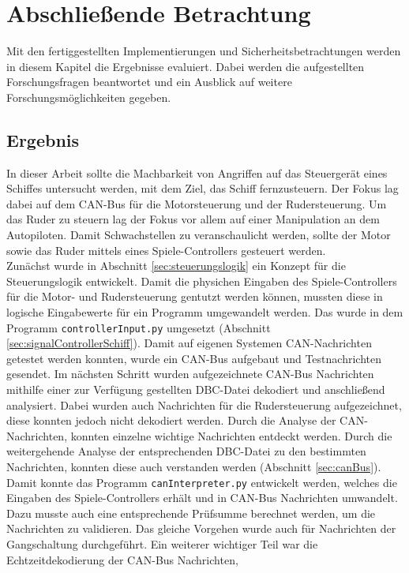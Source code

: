 \chapter{Abschließende Betrachtung}

Mit den fertiggestellten Implementierungen und Sicherheitsbetrachtungen werden in diesem Kapitel die 
Ergebnisse evaluiert. Dabei werden die aufgestellten Forschungsfragen beantwortet und ein Ausblick auf
weitere Forschungsmöglichkeiten gegeben.

\section{Ergebnis}
In dieser Arbeit sollte die Machbarkeit von Angriffen auf das Steuergerät eines Schiffes untersucht werden, mit dem Ziel, 
das Schiff fernzusteuern.
Der Fokus lag dabei auf dem CAN-Bus für die Motorsteuerung und der Rudersteuerung. Um das Ruder zu steuern lag der Fokus
vor allem auf einer Manipulation an dem Autopiloten.
Damit Schwachstellen zu veranschaulicht werden, sollte der Motor sowie das Ruder mittels eines Spiele-Controllers gesteuert werden. \\
Zunächst wurde in Abschnitt \ref{sec:steuerungslogik} ein Konzept für die Steuerungslogik entwickelt.
Damit die physichen Eingaben des Spiele-Controllers für die Motor- und Rudersteuerung gentutzt werden können, 
mussten diese in logische Eingabewerte für ein Programm umgewandelt werden.
Das wurde in dem Programm \texttt{controllerInput.py} umgesetzt (Abschnitt \ref{sec:signalControllerSchiff}). 
Damit auf eigenen Systemen CAN-Nachrichten getestet werden konnten, wurde ein CAN-Bus aufgebaut und Testnachrichten gesendet.
Im nächsten Schritt wurden aufgezeichnete CAN-Bus Nachrichten mithilfe einer zur Verfügung gestellten 
DBC-Datei dekodiert und anschließend analysiert. 
Dabei wurden auch Nachrichten für die Rudersteuerung aufgezeichnet, diese konnten jedoch nicht dekodiert werden.
Durch die Analyse der CAN-Nachrichten, konnten einzelne wichtige Nachrichten entdeckt werden. Durch die weitergehende Analyse
der entsprechenden DBC-Datei zu den bestimmten Nachrichten, konnten diese auch verstanden werden (Abschnitt \ref{sec:canBus}).
Damit konnte das Programm \texttt{canInterpreter.py} entwickelt werden, welches die Eingaben des Spiele-Controllers erhält und 
in CAN-Bus Nachrichten umwandelt.
Dazu musste auch eine entsprechende Prüfsumme berechnet werden, um die Nachrichten zu validieren. Das gleiche Vorgehen wurde auch
für Nachrichten der Gangschaltung durchgeführt. Ein weiterer wichtiger Teil war die Echtzeitdekodierung der CAN-Bus Nachrichten,
